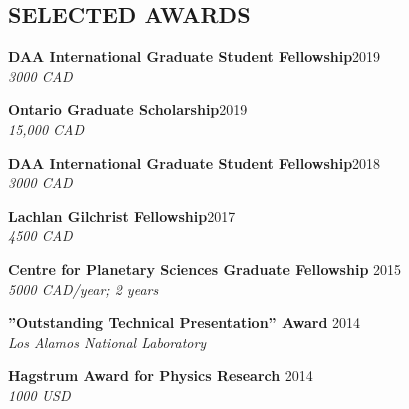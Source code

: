 \documentclass[10pt]{res} %
\begin{document}
\begin{resume}

\section{SELECTED AWARDS}

\textbf{DAA International Graduate Student Fellowship}\hfill 2019\\{\sl 3000 CAD}

\textbf{Ontario Graduate Scholarship}\hfill 2019\\{\sl 15,000 CAD}

\textbf{DAA International Graduate Student Fellowship}\hfill 2018\\{\sl 3000 CAD}

\textbf{Lachlan Gilchrist Fellowship}\hfill 2017\\
{\sl 4500 CAD}

\textbf{Centre for Planetary Sciences Graduate Fellowship} \hfill 2015\\
{\sl 5000 CAD/year; 2 years}

\textbf{”Outstanding Technical Presentation” Award} \hfill 2014\\
{\sl Los Alamos National Laboratory}


\textbf{Hagstrum Award for Physics Research} \hfill 2014 \\
{\sl 1000 USD}









\end{resume}
\end{document}
